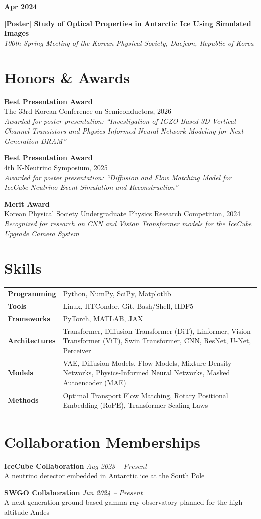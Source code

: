 \documentclass[11pt, a4paper]{article}
\newcommand{\conferenceitem}[3]{%
    \noindent
    \parbox[t]{0.15\textwidth}{{\color{primary}\textbf{#1}}}%
    \hfill
    \parbox[t]{0.83\textwidth}{\textbf{#2}\\[2pt]\textit{#3}}%
    \vspace{8pt}\par
}
\newcommand{\awarditem}[3]{
    \begin{tcolorbox}[
        colback=white,
        colframe=primary,
        boxrule=0pt,
        leftrule=3pt,
        arc=0pt,
        left=5pt,
        right=5pt,
        top=4pt,
        bottom=4pt
    ]
    \textbf{#1} \\[2pt]
    #2 \\[2pt]
    {\small\textit{#3}}
    \end{tcolorbox}
    \vspace{3pt}
}
\begin{document}
\conferenceitem{Apr 2024}{[Poster] Study of Optical Properties in Antarctic Ice Using Simulated Images}{100th Spring Meeting of the Korean Physical Society, Daejeon, Republic of Korea}

\newpage
\section{Honors \& Awards}
\awarditem{Best Presentation Award}{The 33rd Korean Conference on Semiconductors, 2026}{Awarded for poster presentation: ``Investigation of IGZO-Based 3D Vertical Channel Transistors and
Physics-Informed Neural Network Modeling for Next-Generation DRAM''}

\awarditem{Best Presentation Award}{4th K-Neutrino Symposium, 2025}{Awarded for poster presentation: ``Diffusion and Flow Matching Model for IceCube Neutrino Event Simulation and Reconstruction''}

\awarditem{Merit Award}{Korean Physical Society Undergraduate Physics Research Competition, 2024}{Recognized for research on CNN and Vision Transformer models for the IceCube Upgrade Camera System}

\section{Skills}

\begin{tabularx}{\textwidth}{@{}>{\bfseries}p{}X@{}}
Programming    & Python, NumPy, SciPy, Matplotlib \\[6pt]
Tools          & Linux, HTCondor, Git, Bash/Shell, HDF5 \\[6pt]
Frameworks     & PyTorch, MATLAB, JAX \\[6pt]
Architectures  & Transformer, Diffusion Transformer (DiT), Linformer, Vision Transformer (ViT), Swin Transformer, CNN, ResNet, U-Net, Perceiver \\[6pt]
Models         & VAE, Diffusion Models, Flow Models, Mixture Density Networks, Physics-Informed Neural Networks, Masked Autoencoder (MAE) \\[6pt]
Methods        & Optimal Transport Flow Matching, Rotary Positional Embedding (RoPE), Transformer Scaling Laws \\[6pt]
\end{tabularx}

\section{Collaboration Memberships}

\noindent
\textbf{IceCube Collaboration} \hfill \textit{Aug 2023 -- Present} \\
{\small A neutrino detector embedded in Antarctic ice at the South Pole}

\vspace{8pt}

\noindent
\textbf{SWGO Collaboration} \hfill \textit{Jun 2024 -- Present} \\
{\small A next-generation ground-based gamma-ray observatory planned for the high-altitude Andes}
\end{document}

